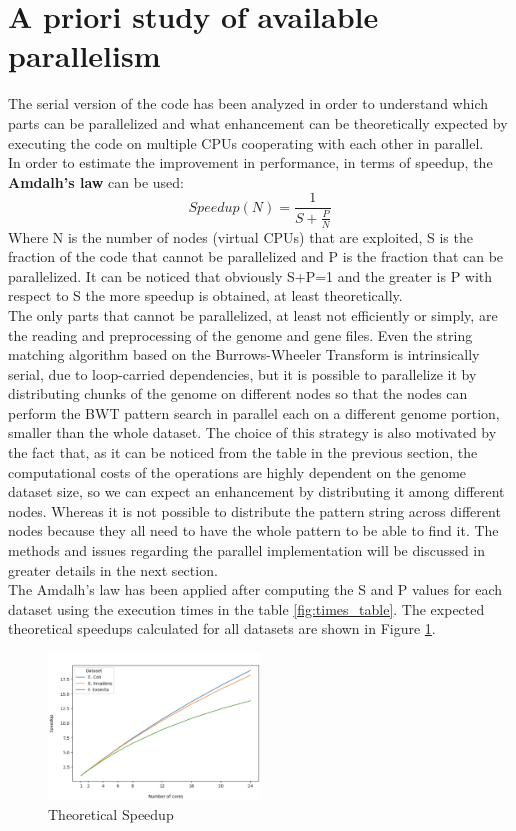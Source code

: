 \documentclass[final,5p,times,twocolumn,authoryear]{elsarticle}
\begin{document}
\section{A priori study of available parallelism}
The serial version of the code has been analyzed in order to understand which parts can be parallelized and what enhancement can be theoretically expected by executing the code on multiple CPUs cooperating with each other in parallel.\\
In order to estimate the improvement in performance, in terms of speedup, the \textbf{Amdalh's law} can be used:
$$ Speedup(N) = \frac{1}{S + \frac{P}{N}} $$
Where N is the number of nodes (virtual CPUs) that are exploited, S is the fraction of the code that cannot be parallelized and P is the fraction that can be parallelized. It can be noticed that obviously S+P=1 and the greater is P with respect to S the more speedup is obtained, at least theoretically.\\
The only parts that cannot be parallelized, at least not efficiently or simply, are the reading and preprocessing of the genome and gene files. Even the string matching algorithm based on the Burrows-Wheeler Transform is intrinsically serial, due to loop-carried dependencies, but it is possible to parallelize it by distributing chunks of the genome on different nodes so that the nodes can perform the BWT pattern search in parallel each on a different genome portion, smaller than the whole dataset. The choice of this strategy is also motivated by the fact that, as it can be noticed from the table in the previous section, the computational costs of the operations are highly dependent on the genome dataset size, so we can expect an enhancement by distributing it among different nodes. Whereas it is not possible to distribute the pattern string across different nodes because they all need to have the whole pattern to be able to find it. The methods and issues regarding the parallel implementation will be discussed in greater details in the next section. \\
The Amdalh's law has been applied after computing the S and P values for each dataset using the execution times in the table \ref{fig:times_table}. The expected theoretical speedups calculated for all datasets are shown in Figure \ref{fig:theoretical-speedup-label}.
\begin{figure}
    \centering
    \includegraphics[width=0.5\textwidth]{images/theoretical_speedup.png}
    \caption{Theoretical Speedup}
    \label{fig:theoretical-speedup-label}
\end{figure}
\end{document}
